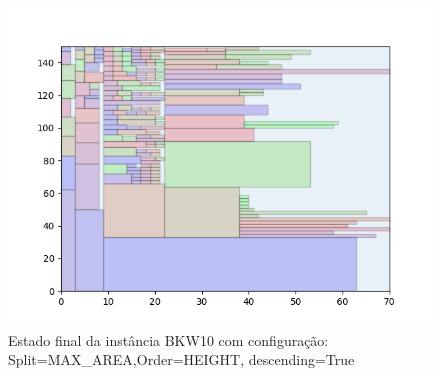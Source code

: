 \begin{figure}[H]
    \centering
    \caption[]{Estado final da instância BKW10 com configuração: Split=MAX_AREA,Order=HEIGHT, descending=True}
    \label{fig:bkw10-max_area-height-true}
    \includegraphics[scale=0.5]{output/figures/bkw/bkw10/max_area/height/true/000}
\end{figure}